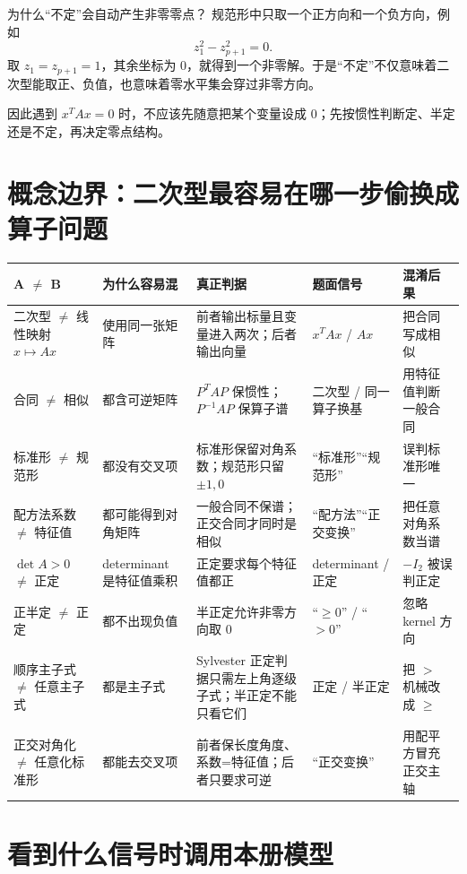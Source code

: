 \documentclass[11pt,a4paper]{ctexart}
\begin{document}
\begin{examplebox}{为什么“不定”会自动产生非零零点？}
规范形中只取一个正方向和一个负方向，例如
\[
z_1^2-z_{p+1}^2=0.
\]
取 $z_1=z_{p+1}=1$，其余坐标为 $0$，就得到一个非零解。于是“不定”不仅意味着二次型能取正、负值，也意味着零水平集会穿过非零方向。
\end{examplebox}

因此遇到 $x^TAx=0$ 时，不应该先随意把某个变量设成 $0$；先按惯性判断定、半定还是不定，再决定零点结构。

\section{概念边界：二次型最容易在哪一步偷换成算子问题}

\begin{longtable}{L{2.5cm}L{3.0cm}L{3.8cm}L{3.2cm}L{\dimexpr\linewidth-13.1cm\relax}}
\toprule
\textbf{A $\neq$ B} & \textbf{为什么容易混} & \textbf{真正判据} & \textbf{题面信号} & \textbf{混淆后果}\\
\midrule
二次型 $\neq$ 线性映射 $x\mapsto Ax$ & 使用同一张矩阵 & 前者输出标量且变量进入两次；后者输出向量 & $x^TAx$ / $Ax$ & 把合同写成相似\\
合同 $\neq$ 相似 & 都含可逆矩阵 & $P^TAP$ 保惯性；$P^{-1}AP$ 保算子谱 & 二次型 / 同一算子换基 & 用特征值判断一般合同\\
标准形 $\neq$ 规范形 & 都没有交叉项 & 标准形保留对角系数；规范形只留 $\pm1,0$ & “标准形”“规范形” & 误判标准形唯一\\
配方法系数 $\neq$ 特征值 & 都可能得到对角矩阵 & 一般合同不保谱；正交合同才同时是相似 & “配方法”“正交变换” & 把任意对角系数当谱\\
$\det A>0$ $\neq$ 正定 & determinant 是特征值乘积 & 正定要求每个特征值都正 & determinant / 正定 & $-I_2$ 被误判正定\\
正半定 $\neq$ 正定 & 都不出现负值 & 半正定允许非零方向取 $0$ & “$\ge0$” / “$>0$” & 忽略 kernel 方向\\
顺序主子式 $\neq$ 任意主子式 & 都是主子式 & Sylvester 正定判据只需左上角逐级子式；半正定不能只看它们 & 正定 / 半正定 & 把 $>$ 机械改成 $\ge$\\
正交对角化 $\neq$ 任意化标准形 & 都能去交叉项 & 前者保长度角度、系数=特征值；后者只要求可逆 & “正交变换” & 用配平方冒充正交主轴\\
\bottomrule
\end{longtable}

\section{看到什么信号时调用本册模型}
\end{document}
